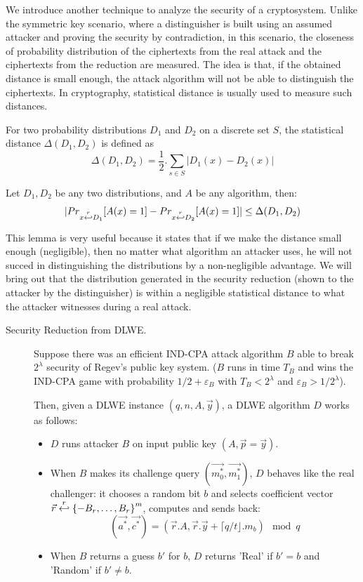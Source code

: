 \begin{description}
  We introduce another technique to analyze the security of a
  cryptosystem. Unlike the symmetric key scenario, where a
  distinguisher is built using an assumed attacker and proving the security by
  contradiction, in this scenario, the closeness of probability
  distribution of the ciphertexts from the real attack and the ciphertexts from the reduction are measured. The
  idea is that, if the obtained distance is small enough, the attack algorithm will not be able to
  distinguish the ciphertexts. In cryptography, statistical distance is usually
  used to measure such distances.
  \begin{definition}
     For two probability distributions $D_1$ and $D_2$ on
    a discrete set $S$, the statistical distance $\Delta(D_1,D_2)$ is defined as
    \[
      \Delta(D_1, D_2) = \frac{1}{2}. \sum_{s \in S}|D_1(x) - D_2(x)|
    \]
    \label{def:statisticalDistance}
  \end{definition}
  \begin{lemma}
    Let $D_1, D_2$ be any two distributions, and $A$ be any algorithm, then:
    \[
      |Pr_{x\stackrel{r}{\hookleftarrow} D_1}[A(x) = 1] - Pr_{x\stackrel{r}{\hookleftarrow} D_2}[A(x) = 1]|
      \leq \Delta(D_1, D_2)
    \]
    \label{lem:statisticalDistance}
  \end{lemma}
  This lemma is very useful because it states that if we make the distance small
  enough (negligible), then no matter what algorithm an attacker uses, he will not succed in distinguishing the distributions by a non-negligible advantage. We will
  bring out that the distribution generated in the security reduction (shown to the attacker by the
  distinguisher) is within a negligible statistical
  distance to what the attacker witnesses during a real attack.

  \begin{description}
  \item[Security Reduction from DLWE.] Suppose there was an efficient IND-CPA
    attack algorithm $B$ able to break $2^\lambda$ security of Regev's public key
    system. ($B$ runs in time $T_B$ and wins the IND-CPA game with probability
    $1/2 + \varepsilon_B$ with $T_B < 2^\lambda$ and
    $\varepsilon_B > 1/2^\lambda$).

    Then, given a DLWE instance $(q,n,A,\vec{y})$, a DLWE algorithm $D$ works as
    follows:
    \begin{itemize}
    \item $D$ runs attacker $B$ on input public key $(A, \vec{p} = \vec{y})$.
    \item When $B$ makes its challenge query $(\vec{m_0^*}, \vec{m_1^*})$, $D$
      behaves like the real challenger: it chooses a random bit $b$ and selects
      coefficient vector
      $\vec{r} \stackrel{r}{\hookleftarrow} \left\{ -B_r, \dots, B_r \right\}^m$, computes and
      sends back:
      \[
        (\vec{a^*}, \vec{c^*}) = (\vec{r}.A, \vec{r}.\vec{y} + \lceil q/t
        \rfloor .  m_b) \mod q
      \]
    \item When $B$ returns a guess $b'$ for $b$, $D$ returns 'Real' if $b'=b$
      and 'Random' if $b' \neq b$.
    \end{itemize}


\end{description}
\end{description}
